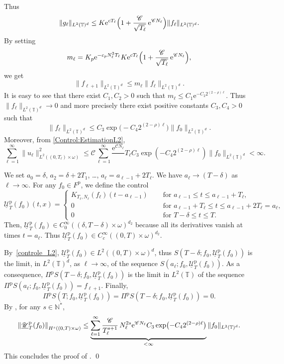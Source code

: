 \documentclass[10pt]{amsart}
\let\mathcal\mathscr
\theoremstyle{plain}
\theoremstyle{definition}
\theoremstyle{remark}
\newcommand{\set}{\mathbb}
\newcommand{\T}{\set{T}}
\newcommand{\p}{{\mathrm p}}
\newcommand{\eu}{\mathrm e}
\let\originalleft\left
\let\originalright\right
\renewcommand{\left}{\mathopen{}\mathclose\bgroup\originalleft}
\renewcommand{\right}{\aftergroup\egroup\originalright}
\begin{document}
Thus
\[
\|g_\ell\|_{L^2(\T)^d} \leq K \eu^{cT_\ell} \Bigl(1 + \frac{\mathcal{C}}{\sqrt{T_\ell}}\, \eu^{\mathcal{C} N_\ell}\Bigr)
\|f_\ell\|_{L^2(\T)^d}.
\]
By setting
\[
m_\ell = K_p \eu^{- c_p N_\ell^2 T_\ell} K \eu^{cT_\ell} \Bigl(1 + \frac{\mathcal{C}}{\sqrt{T_\ell}}\, \eu^{\mathcal{C} N_\ell}\Bigr),
\]
we get
\[
\|f_{\ell+1}\|_{L^2(\T)^d} \leq m_\ell \|f_\ell \|_{L^2(\T)^d}.
\]
It is easy to see that there exist $C_1, C_2>0$ such that $m_\ell \leq C_1 \eu^{-C_2 2^{(2-\rho)\ell}}$. Thus $\|f_\ell\|_{L^2(\T)^d} \to 0$ and more precisely there exist positive constants $C_3, C_4>0$ such that
\[
\|f_\ell\|_{L^2(\T)^d} \leq C_3 \exp \bigl(-C_4 2^{(2-\rho)\ell} \bigr) \|f_0\|_{L^2(\T)^d}.
\]
Moreover, from \eqref{Control:EstimationL2},
\begin{equation}\label{controle_L2}
\sum_{\ell=1}^\infty \| u_\ell \|_{L^2((0,T_\ell)\times\omega)}^2 \leq
\mathcal{C} \sum_{\ell=1}^\infty \frac{\eu^{\mathcal{C}N_\ell}}\,{T_\ell} C_3 \exp(-C_4 2^{(2-\rho)\ell}) \|f_0\|_{L^2(\T)^d} <\infty.
\end{equation}

We set $a_0=\delta$, $a_2=\delta+2T_1$, \ldots, $a_\ell=a_{\ell-1}+2T_\ell$. We have $a_\ell \to (T-\delta)$ as $\ell \to \infty$. For any $f_0 \in F^\p$, we define the control
\[
\underline{\mathcal{U}}_T^{\p}(f_0)(t,x)=\begin{cases}
K_{T_\ell,N_\ell}(f_\ell)(t-a_{\ell-1})\quad & \text{ for } a_{\ell-1}\leq t \leq a_{\ell-1}+T_\ell, \\
0 & \text{ for } a_{\ell-1}+T_\ell\leq t \leq a_{\ell-1}+2T_\ell=a_{\ell},
\\
0 & \text{ for } T-\delta \leq t \leq T.
\end{cases}
\]
Then, $\underline{\mathcal{U}}_T^{\p}(f_0) \in C^\infty_0((\delta,T-\delta)\times \omega)^{d_2}$ because all its derivatives vanish at times $t=a_\ell$. Thus $\underline{\mathcal{U}}_T^{\p}(f_0) \in C^\infty_c((0,T)\times\omega)^{d_2}$.

By~\eqref{controle_L2}, $\underline{\mathcal{U}}_T^{\p}(f_0) \in L^2((0,T)\times\omega)^d$, thus
$S(T-\delta;f_0,\underline{\mathcal{U}}_T^{\p}(f_0))$ is the limit, in $L^2(\T)^d$, as $\ell \to \infty$, of the sequence $S(a_\ell;f_0,\underline{\mathcal{U}}_T^{\p}(f_0))$. As a consequence,
\hbox{$\Pi^\p S(T-\delta;f_0,\underline{\mathcal{U}}_T^{\p}(f_0))$} is the limit in $L^2(\T)$ of the sequence $\Pi^\p S(a_\ell;f_0,\underline{\mathcal{U}}_T^{\p}(f_0))=f_{\ell+1}$.
Finally,
\[
\Pi^\p S(T;f_0,\underline{\mathcal{U}}_T^{\p}(f_0))=\Pi^\p S(T-\delta;f_0,\underline{\mathcal{U}}_T^{\p}(f_0))=0.
\]
By , for any $s\in\mathbb{N}^*$,
\[
\left\| \underline{\mathcal{U}}_T^{\p}(f_0) \right\|_{H^s((0,T)\times\omega)}
\leq \underbrace{\sum_{\ell=1}^\infty \frac{\mathcal{C}}{T_\ell^{s+1}}\, N_\ell^{2s} \eu^{\mathcal{C} N_\ell} C_3 \exp \bigl(-C_4 2^{(2-\rho)\ell} \bigr)}_{< \infty}
\|f_0\|_{L^2(\T)^d}.
\]
This concludes the proof of . \qed
\end{document}
